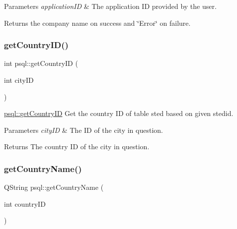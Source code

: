 \begin{DoxyParams}{Parameters}
{\em application\+ID} & The application ID provided by the user. \\
\hline
\end{DoxyParams}
\begin{DoxyReturn}{Returns}
the company name on success and \char`\"{}\+Error\char`\"{} on failure. 
\end{DoxyReturn}
\mbox{\label{classpsql_a81d02dc0350ba11d90257914078ba432}} 
\subsubsection{\texorpdfstring{get\+Country\+I\+D()}{getCountryID()}}
{\footnotesize\ttfamily int psql\+::get\+Country\+ID (\begin{DoxyParamCaption}\item[{int}]{city\+ID }\end{DoxyParamCaption})}



\mbox{\hyperlink{classpsql_a81d02dc0350ba11d90257914078ba432}{psql\+::get\+Country\+ID}} Get the country ID of table sted based on given stedid. 


\begin{DoxyParams}{Parameters}
{\em city\+ID} & The ID of the city in question. \\
\hline
\end{DoxyParams}
\begin{DoxyReturn}{Returns}
The country ID of the city in question. 
\end{DoxyReturn}
\mbox{\label{classpsql_a5724e9992e6a5c98524ab73b98f4202d}} 
\subsubsection{\texorpdfstring{get\+Country\+Name()}{getCountryName()}}
{\footnotesize\ttfamily Q\+String psql\+::get\+Country\+Name (\begin{DoxyParamCaption}\item[{int}]{country\+ID }\end{DoxyParamCaption})}



